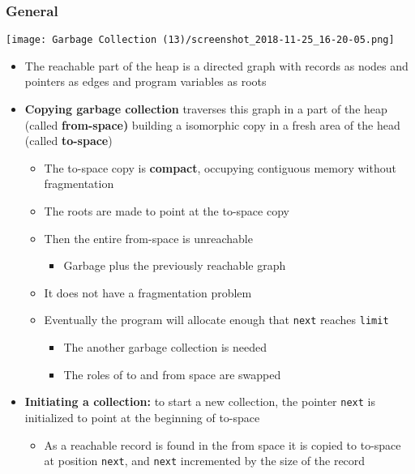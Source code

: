 \documentclass[11pt]{article}
\begin{document}
\subsubsection{General}
\label{sec:org70c7df8}
\begin{center}
\texttt{[image: Garbage Collection (13)/screenshot\_2018-11-25\_16-20-05.png]}
\end{center}
\begin{itemize}
\item The reachable part of the heap is a directed graph with records as nodes and pointers as edges and program variables as roots
\item \textbf{Copying garbage collection} traverses this graph in a part of the heap (called \textbf{from-space)} building a isomorphic copy in a fresh area of the head (called \textbf{to-space})
\begin{itemize}
\item The to-space copy is \textbf{compact}, occupying contiguous memory without fragmentation
\item The roots are made to point at the to-space copy
\item Then the entire from-space is unreachable
\begin{itemize}
\item Garbage plus the previously reachable graph
\end{itemize}
\item It does not have a fragmentation problem
\item Eventually the program will allocate enough that \texttt{next} reaches \texttt{limit}
\begin{itemize}
\item The another garbage collection is needed
\item The roles of to and from space are swapped
\end{itemize}
\end{itemize}

\item \textbf{Initiating a collection:} to start a new collection, the pointer \texttt{next} is initialized to point at the beginning of to-space
\begin{itemize}
\item As a reachable record is found in the from space it is copied to to-space at position \texttt{next}, and \texttt{next} incremented by the size of the record
\end{itemize}
\end{itemize}
\end{document}

